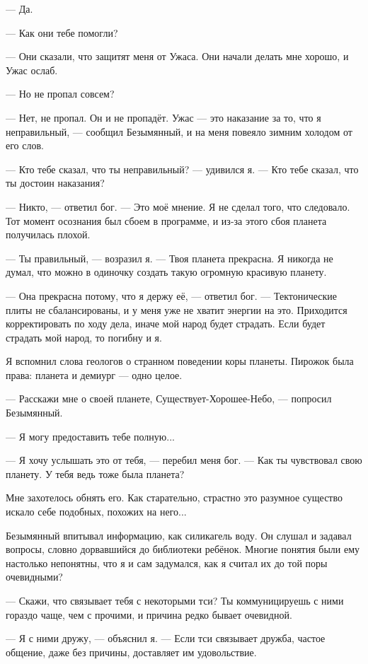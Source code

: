 --- Да.

--- Как они тебе помогли?

--- Они сказали, что защитят меня от Ужаса.
Они начали делать мне хорошо, и Ужас ослаб.

--- Но не пропал совсем?

--- Нет, не пропал.
Он и не пропадёт.
Ужас --- это наказание за то, что я неправильный, --- сообщил Безымянный, и на меня повеяло зимним холодом от его слов.

--- Кто тебе сказал, что ты неправильный? --- удивился я.
--- Кто тебе сказал, что ты достоин наказания?

--- Никто, --- ответил бог.
--- Это моё мнение.
Я не сделал того, что следовало.
Тот момент осознания был сбоем в программе, и из-за этого сбоя планета получилась плохой.

--- Ты правильный, --- возразил я.
--- Твоя планета прекрасна.
Я никогда не думал, что можно в одиночку создать такую огромную красивую планету.

--- Она прекрасна потому, что я держу её, --- ответил бог.
--- Тектонические плиты не сбалансированы, и у меня уже не хватит энергии на это.
Приходится корректировать по ходу дела, иначе мой народ будет страдать.
Если будет страдать мой народ, то погибну и я.

Я вспомнил слова геологов о странном поведении коры планеты.
Пирожок была права: планета и демиург --- одно целое.

--- Расскажи мне о своей планете, Существует-Хорошее-Небо, --- попросил Безымянный.

--- Я могу предоставить тебе полную...

--- Я хочу услышать это от тебя, --- перебил меня бог.
--- Как ты чувствовал свою планету.
У тебя ведь тоже была планета?

Мне захотелось обнять его.
Как старательно, страстно это разумное существо искало себе подобных, похожих на него...

Безымянный впитывал информацию, как силикагель воду.
Он слушал и задавал вопросы, словно дорвавшийся до библиотеки ребёнок.
Многие понятия были ему настолько непонятны, что я и сам задумался, как я считал их до той поры очевидными?

--- Скажи, что связывает тебя с некоторыми тси?
Ты коммуницируешь с ними гораздо чаще, чем с прочими, и причина редко бывает очевидной.

--- Я с ними дружу, --- объяснил я.
--- Если тси связывает дружба, частое общение, даже без причины, доставляет им удовольствие.

